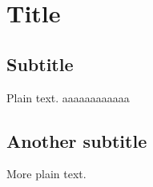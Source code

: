 \documentclass{article}
\begin{document}
\section{Title}

\subsection{Subtitle}

Plain text.
aaaaaaaaaaaa
\subsection{Another subtitle}

More plain text.
\end{document}
